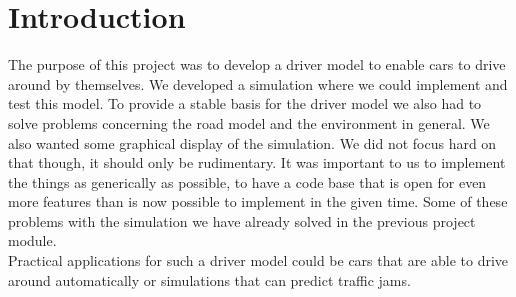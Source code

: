 
\section{Introduction}

The purpose of this project was to develop a driver model
to enable cars to drive around by themselves. We developed
a simulation where we could implement and test this model.
To provide a stable basis for the driver model we also had
to solve problems concerning the road model and the environment
in general. We also wanted some graphical display of the simulation.
We did not focus hard on that though, it should only be 
rudimentary. It was important to us to implement the things
as generically as possible, to have a code base that is open for
even more features than is now possible to implement in the
given time. Some of these problems with the simulation we have 
already solved in the previous project module. \\

Practical applications for such a driver model could be 
cars that are able to drive around automatically or
simulations that can predict traffic jams.
